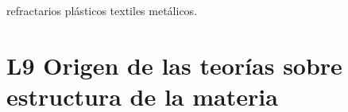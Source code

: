 \documentclass[12pt,addpoints,answers]{repaso}
\begin{document}
\begin{questions}
{\begin{multicols}{2}
\begin{parts}
                    \begin{multicols}{2}
                    \begin{choices}
                         \choice  refractarios  \choice  plásticos  \choice  textiles  \choice  metálicos.
                    \end{choices}
               \end{multicols}
     \end{parts}
\end{multicols}
}



\section*{L9 Origen de las teorías sobre estructura de la materia}

\end{questions}
\end{document}
